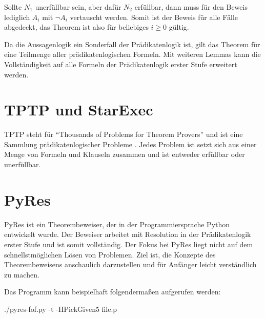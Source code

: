 Sollte $N_1$ unerfüllbar sein, aber dafür $N_2$ erfüllbar, dann muss für den Beweis lediglich $A_i$ mit $\neg A_i$ vertauscht werden. Somit ist der Beweis für alle Fälle abgedeckt, das Theorem ist also für beliebiges $i \geq 0$ gültig.

Da die Aussagenlogik ein Sonderfall der Prädikatenlogik ist, gilt das Theorem für eine Teilmenge aller prädikatenlogischen Formeln. Mit weiteren Lemmas kann die Vollständigkeit auf alle Formeln der Prädikatenlogik erster Stufe erweitert werden. \cite{Wos1965Sos}
		
	\section{TPTP und StarExec}
	
TPTP steht für "`Thousands of Problems for Theorem Provers"' und ist eine Sammlung prädikatenlogischer Probleme \cite{Sutcliff2021TPTP}. Jedes Problem ist setzt sich aus einer Menge von Formeln und Klauseln zusammen und ist entweder erfüllbar oder unerfüllbar. 
		
	\section{PyRes}
PyRes ist ein Theorembeweiser, der in der Programmiersprache Python entwickelt wurde. Der Beweiser arbeitet mit Resolution in der Prädikatenlogik erster Stufe und ist somit vollständig. Der Fokus bei PyRes liegt nicht auf dem schnellstmöglichen Lösen von Problemen. Ziel ist, die Konzepte des Theorembeweisens anschaulich darzustellen und für Anfänger leicht verständlich zu machen. \cite{Schulz2020PyRes}

Das Programm kann beispielhaft folgendermaßen aufgerufen werden:

./pyres-fof.py -t -HPickGiven5 file.p

